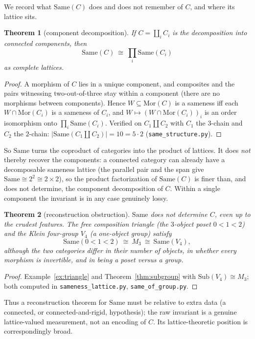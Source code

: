 \documentclass[11pt]{amsart}
\newtheorem{thm}{Theorem}[section]
\theoremstyle{definition}
\newcommand{\Same}{\mathrm{Same}}
\newcommand{\Sub}{\mathrm{Sub}}
\newcommand{\Mor}{\mathrm{Mor}}
\begin{document}
We record what $\Same(C)$ does and does not remember of $C$, and where its
lattice sits.

\begin{thm}[component decomposition]\label{thm:components}
If $C=\coprod_{i} C_i$ is the decomposition into connected components, then
\[
\Same(C)\ \cong\ \prod_{i}\Same(C_i)
\]
as complete lattices.
\end{thm}

\begin{proof}
A morphism of $C$ lies in a unique component, and composites and the pairs
witnessing two-out-of-three stay within a component (there are no morphisms
between components). Hence $W\subseteq\Mor(C)$ is a sameness iff each
$W\cap\Mor(C_i)$ is a sameness of $C_i$, and $W\mapsto(W\cap\Mor(C_i))_i$ is an
order isomorphism onto $\prod_i\Same(C_i)$. Verified on
$C_1\amalg C_2$ with $C_1$ the $3$-chain and $C_2$ the $2$-chain:
$|\Same(C_1\amalg C_2)|=10=5\cdot 2$ (\texttt{same\_structure.py}).
\end{proof}

So $\Same$ turns the coproduct of categories into the product of lattices. It
does \emph{not} thereby recover the components: a connected category can already
have a decomposable sameness lattice (the parallel pair and the span give
$\Same\cong 2^{2}\cong 2\times 2$), so the product factorization of $\Same(C)$ is
finer than, and does not determine, the component decomposition of $C$. Within a
single component the invariant is in any case genuinely lossy.

\begin{thm}[reconstruction obstruction]\label{thm:obstruction}
$\Same$ does not determine $C$, even up to the crudest features. The free
composition triangle (the $3$-object poset $0<1<2$) and the Klein four-group
$V_4$ (a one-object group) satisfy
\[
\Same(0<1<2)\ \cong\ M_3\ \cong\ \Same(V_4),
\]
although the two categories differ in their number of objects, in whether every
morphism is invertible, and in being a poset versus a group.
\end{thm}

\begin{proof}
Example~\ref{ex:triangle} and Theorem~\ref{thm:subgroup} with
$\Sub(V_4)\cong M_3$; both computed in \texttt{sameness\_lattice.py},
\texttt{same\_of\_group.py}.
\end{proof}

Thus a reconstruction theorem for $\Same$ must be relative to extra data (a
connected, or connected-and-rigid, hypothesis); the raw invariant is a genuine
lattice-valued measurement, not an encoding of $C$. Its lattice-theoretic
position is correspondingly broad.
\end{document}
